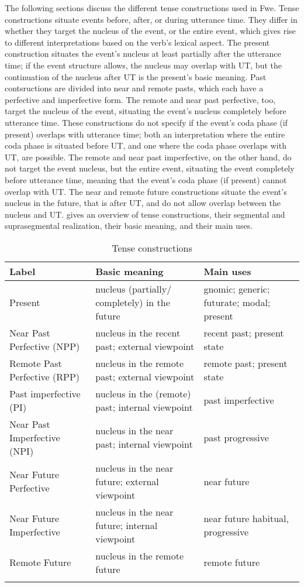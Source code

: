 The following sections discuss the different tense constructions used in Fwe. Tense constructions situate events before, after, or during utterance time. They differ in whether they target the nucleus of the event, or the entire event, which gives rise to different interpretations based on the verb’s lexical aspect. The present construction situates the event’s nucleus at least partially after the utterance time; if the event structure allows, the nucleus may overlap with UT, but the continuation of the nucleus after UT is the present’s basic meaning. Past contsructions are divided into near and remote pasts, which each have a perfective and imperfective form. The remote and near past perfective, too, target the nucleus of the event, situating the event’s nucleus completely before utterance time. These constructions do not specify if the event’s coda phase (if present) overlaps with utterance time; both an interpretation where the entire coda phase is situated before UT, and one where the coda phase overlaps with UT, are possible. The remote and near past imperfective, on the other hand, do not target the event nucleus, but the entire event, situating the event completely before utterance time, meaning that the event’s coda phase (if present) cannot overlap with UT. The near and remote future constructions situate the event’s nucleus in the future, that is after UT, and do not allow overlap between the nucleus and UT.  gives an overview of tense constructions, their segmental and suprasegmental realization, their basic meaning, and their main uses.

\begin{table}[t]
\label{bkm:Ref492292016}\caption{\label{tab:8:3}Tense constructions}
\begin{tabularx}{\textwidth}{lQQ}
\lsptoprule
Label & Basic meaning & Main uses\\
\midrule
Present & nucleus (partially/ completely) in the future & gnomic; generic; futurate; modal; present\\
Near Past Perfective (NPP) & nucleus in the recent past; external viewpoint & recent past; present state\\
Remote Past Perfective (RPP) & nucleus in the remote past; external viewpoint & remote past; present state\\
Past imperfective (PI) & nucleus in the (remote) past; internal viewpoint & past imperfective\\
Near Past Imperfective (NPI) & nucleus in the near past; internal viewpoint & past progressive\\
Near Future Perfective & nucleus in the near future; external viewpoint & near future\\
Near Future Imperfective & nucleus in the near future; internal viewpoint & near future habitual, progressive\\
Remote Future & nucleus in the remote future & remote future\\
\lspbottomrule
\end{tabularx}
\end{table}
